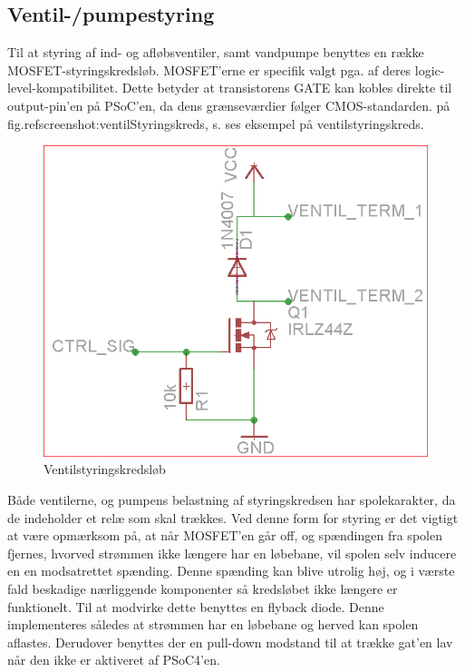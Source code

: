 \subsection{Ventil-/pumpestyring}
Til at styring af ind- og afløbsventiler, samt vandpumpe benyttes en række MOSFET-styringskredsløb. MOSFET'erne er specifik valgt pga. af deres logic-level-kompatibilitet. Dette betyder at transistorens GATE kan kobles direkte til output-pin'en på PSoC'en, da dens grænseværdier følger CMOS-standarden. på fig.ref{screenshot:ventilStyringskreds}, s.\pageref{screenshot:ventilStyringskreds} ses eksempel på ventilstyringskreds.

\begin{figure}[H]
	\centering
	\includegraphics[scale=0.45]{Projektbeskrivelse/DesignOgImplementeringAfHW/Screenshots/VentilStyringskreds}
	\caption{Ventilstyringskredsløb}
	\label{screenshot:ventilStyringskreds}
\end{figure}

Både ventilerne, og pumpens belastning af styringskredsen har spolekarakter, da de indeholder et relæ som skal trækkes. Ved denne form for styring er det vigtigt at være opmærksom på, at når MOSFET'en går off, og spændingen fra spolen fjernes, hvorved strømmen ikke længere har en løbebane, vil spolen selv inducere en en modsatrettet spænding. Denne spænding kan blive utrolig høj, og i værste fald beskadige nærliggende komponenter så kredsløbet ikke længere er funktionelt.\newline 
Til at modvirke dette benyttes en flyback diode. Denne implementeres således at strømmen har en løbebane og herved kan spolen aflastes. Derudover benyttes der en pull-down modstand til at trække gat'en lav når den ikke er aktiveret af PSoC4'en.\\\


